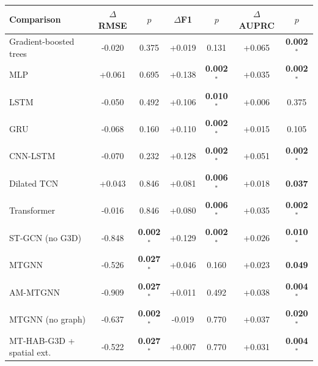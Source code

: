 \begin{tabular}{lcccccc}
\toprule
Comparison & $\Delta$RMSE & $p$ & $\Delta$F1 & $p$ & $\Delta$AUPRC & $p$ \\
\midrule
Gradient-boosted trees & -0.020 & 0.375 & +0.019 & 0.131 & +0.065 & \textbf{0.002}$^{\ast}$ \\
MLP & +0.061 & 0.695 & +0.138 & \textbf{0.002}$^{\ast}$ & +0.035 & \textbf{0.002}$^{\ast}$ \\
LSTM & -0.050 & 0.492 & +0.106 & \textbf{0.010}$^{\ast}$ & +0.006 & 0.375 \\
GRU & -0.068 & 0.160 & +0.110 & \textbf{0.002}$^{\ast}$ & +0.015 & 0.105 \\
CNN-LSTM & -0.070 & 0.232 & +0.128 & \textbf{0.002}$^{\ast}$ & +0.051 & \textbf{0.002}$^{\ast}$ \\
Dilated TCN & +0.043 & 0.846 & +0.081 & \textbf{0.006}$^{\ast}$ & +0.018 & \textbf{0.037} \\
Transformer & -0.016 & 0.846 & +0.080 & \textbf{0.006}$^{\ast}$ & +0.035 & \textbf{0.002}$^{\ast}$ \\
ST-GCN (no G3D) & -0.848 & \textbf{0.002}$^{\ast}$ & +0.129 & \textbf{0.002}$^{\ast}$ & +0.026 & \textbf{0.010}$^{\ast}$ \\
MTGNN & -0.526 & \textbf{0.027}$^{\ast}$ & +0.046 & 0.160 & +0.023 & \textbf{0.049} \\
AM-MTGNN & -0.909 & \textbf{0.027}$^{\ast}$ & +0.011 & 0.492 & +0.038 & \textbf{0.004}$^{\ast}$ \\
MTGNN (no graph) & -0.637 & \textbf{0.002}$^{\ast}$ & -0.019 & 0.770 & +0.037 & \textbf{0.020}$^{\ast}$ \\
MT-HAB-G3D + spatial ext. & -0.522 & \textbf{0.027}$^{\ast}$ & +0.007 & 0.770 & +0.031 & \textbf{0.004}$^{\ast}$ \\
\bottomrule
\end{tabular}
